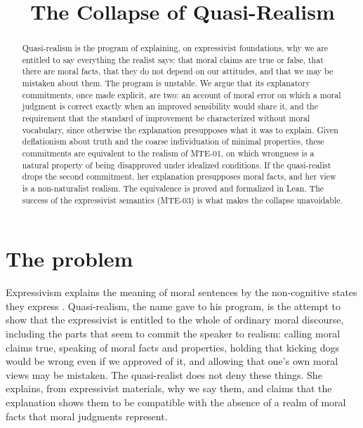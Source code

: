 \documentclass{situationist-preprint}
\title{The Collapse of Quasi-Realism}
\begin{document}
\maketitle

\begin{abstract}
Quasi-realism is the program of explaining, on expressivist foundations, why we are entitled to say everything the realist says: that moral claims are true or false, that there are moral facts, that they do not depend on our attitudes, and that we may be mistaken about them. The program is unstable. We argue that its explanatory commitments, once made explicit, are two: an account of moral error on which a moral judgment is correct exactly when an improved sensibility would share it, and the requirement that the standard of improvement be characterized without moral vocabulary, since otherwise the explanation presupposes what it was to explain. Given deflationism about truth and the coarse individuation of minimal properties, these commitments are equivalent to the realism of MTE-01, on which wrongness is a natural property of being disapproved under idealized conditions. If the quasi-realist drops the second commitment, her explanation presupposes moral facts, and her view is a non-naturalist realism. The equivalence is proved and formalized in Lean. The success of the expressivist semantics (MTE-03) is what makes the collapse unavoidable.
\end{abstract}

\section{The problem}

Expressivism explains the meaning of moral sentences by the non-cognitive states they express \citep{Blackburn1984,Gibbard1990,Gibbard2003}. Quasi-realism, the name \citet{Blackburn1984,Blackburn1993} gave to his program, is the attempt to show that the expressivist is entitled to the whole of ordinary moral discourse, including the parts that seem to commit the speaker to realism: calling moral claims true, speaking of moral facts and properties, holding that kicking dogs would be wrong even if we approved of it, and allowing that one's own moral views may be mistaken. The quasi-realist does not deny these things. She explains, from expressivist materials, why we say them, and claims that the explanation shows them to be compatible with the absence of a realm of moral facts that moral judgments represent.
\end{document}
